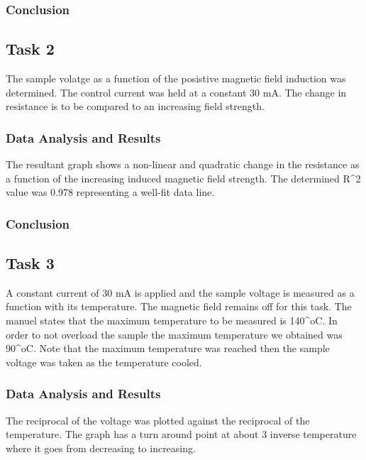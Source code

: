 \documentclass[a4paper]{article}
\begin{document}
\subsubsection{Conclusion}

\subsection{Task 2}

\qq The sample volatge as a function of the posistive magnetic field
induction was determined. The control current was held at a constant
30 mA. The change in resistance is to be compared to an increasing
field strength.

\subsubsection{Data Analysis and Results}
\qq The resultant graph shows a non-linear and quadratic change in the
resistance as a function of the increasing induced magnetic field
strength. The determined R^2 value was 0.978 representing a well-fit
data line.

\subsubsection{Conclusion}

\subsection{Task 3}

\qq A constant current of 30 mA is applied and the sample voltage is
measured as a function with its temperature. The magnetic field
remains off for this task. The manuel states that the maximum
temperature to be measured is 140^oC. In order to not overload the
sample the maximum temperature we obtained was 90^oC. Note that the
maximum temperature was reached then the sample voltage was taken as
the temperature cooled.

\subsubsection{Data Analysis and Results}
\qq The reciprocal of the voltage was plotted against the reciprocal
of the temperature. The graph has a turn around point at about 3
inverse temperature where it goes from decreasing to increasing.
\end{document}
